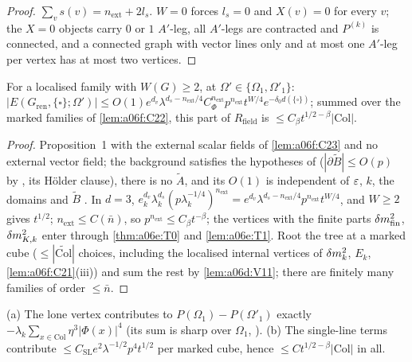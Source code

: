 \begin{proof}
$\sum_vs(v)=n_{\mathrm{ext}}+2l_s$. $W=0$ forces $l_s=0$ and $X(v)=0$ for every $v$; the $X=0$ objects carry $0$ or $1$ $A'$-leg, all $A'$-legs are contracted and $P^{(k)}$ is connected, and a connected graph with vector lines only and at most one $A'$-leg per vertex has at most two vertices.
\end{proof}

\begin{lemma}\label{lem:a06f:C25}
For a localised family with $W(G)\ge2$, at $\Omega'\in\{\Omega_1,\Omega'_1\}$: $|E(G_{\mathrm{ren}},\{\square\};\Omega')|\le O(1)e^{d_v}\lambda^{d_s-n_{\mathrm{ext}}/4}C_\Phi^{n_{\mathrm{ext}}}p^{n_{\mathrm{ext}}}t^{W/4}e^{-\delta_0d(\{\square\})}$; summed over the marked families of \cref{lem:a06f:C22}, this part of $R_{\mathrm{field}}$ is $\le C_\beta t^{1/2-\beta}|\mathrm{Col}|$.
\end{lemma}

\begin{proof}
Proposition~1 with the external scalar fields of \cref{lem:a06f:C23} and no external vector field; the background satisfies the hypotheses of \cite[p.~412]{Ba3} ($|\partial\tilde B|\le O(p)$ by \cite[(2.60)]{Ba2}, its H\"older clause), there is no $\tilde A$, and its $O(1)$ is independent of $\varepsilon$, $k$, the domains and $\tilde B$ \cite[p.~421]{Ba3}. In $d=3$, $e_k^{d_v}\lambda_k^{d_s}(p\lambda_k^{-1/4})^{n_{\mathrm{ext}}}=e^{d_v}\lambda^{d_s-n_{\mathrm{ext}}/4}p^{n_{\mathrm{ext}}}t^{W/4}$, and $W\ge2$ gives $t^{1/2}$; $n_{\mathrm{ext}}\le C(\bar n)$, so $p^{n_{\mathrm{ext}}}\le C_\beta t^{-\beta}$; the \cite[(1.7)]{Ba3} vertices with the finite parts $\delta m^2_{\mathrm{fin}}$, $\delta m^2_{K,k}$ enter through \cref{thm:a06e:T0} and \cref{lem:a06e:T1}. Root the tree at a marked cube ($\le|\widetilde{\mathrm{Col}}|$ choices, including the localised internal vertices of $\delta m^2_k$, $E_k$, \cref{lem:a06f:C21}(iii)) and sum the rest by \cref{lem:a06d:V11}; there are finitely many families of order $\le\bar n$.
\end{proof}

\begin{lemma}[the terms with $W=0$]\label{lem:a06f:C26}
\textup{(a)} The lone \cite[(1.6)]{Ba3} vertex contributes to $P(\Omega_1)-P(\Omega'_1)$ exactly $-\lambda_k\sum_{x\in\mathrm{Col}}\eta^3|\Phi(x)|^4$ (its sum is sharp over $\Omega_1$, \cite[p.~413]{Ba3}). \textup{(b)} The single-line terms contribute $\le C_{\mathrm{SL}}e^2\lambda^{-1/2}p^4t^{1/2}$ per marked cube, hence $\le Ct^{1/2-\beta}|\mathrm{Col}|$ in all.
\end{lemma}

